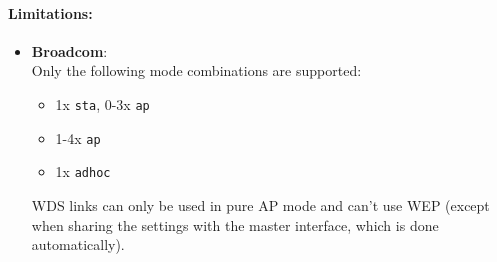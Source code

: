 \paragraph{Limitations:}

\begin{itemize}
    \item \textbf{Broadcom}: \\
        Only the following mode combinations are supported:

        \begin{itemize}
            \item 1x \texttt{sta}, 0-3x \texttt{ap}
            \item 1-4x \texttt{ap}
            \item 1x \texttt{adhoc}
        \end{itemize}

        WDS links can only be used in pure AP mode and can't use WEP (except when sharing the
        settings with the master interface, which is done automatically).

\end{itemize}



